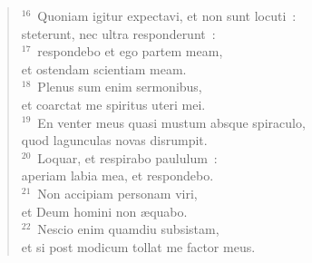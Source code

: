 \begin{flushleft}
\begin{verse}
${}^{16}$~Quoniam igitur expectavi, et non sunt locuti~:\\ steterunt, nec ultra responderunt~:\\
${}^{17}$~respondebo et ego partem meam,\\ et ostendam scientiam meam.\\
${}^{18}$~Plenus sum enim sermonibus,\\ et coarctat me spiritus uteri mei.\\
${}^{19}$~En venter meus quasi mustum absque spiraculo,\\ quod lagunculas novas disrumpit.\\
${}^{20}$~Loquar, et respirabo paululum~:\\ aperiam labia mea, et respondebo.\\
${}^{21}$~Non accipiam personam viri,\\ et Deum homini non \ae quabo.\\
${}^{22}$~Nescio enim quamdiu subsistam,\\ et si post modicum tollat me factor meus.\end{verse}\end{flushleft}


